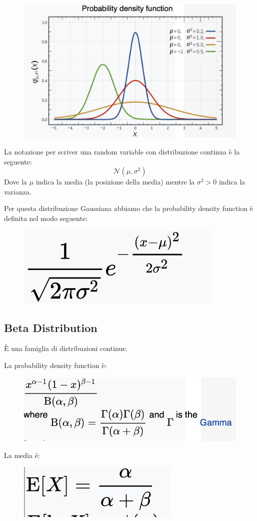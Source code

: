 \documentclass[14pt]{extreport}
\begin{document}
\begin{figure}[H]
\centering
\includegraphics[width=0.5\linewidth]{96.jpeg}
\end{figure}

La notazione per scriver una random variable con distribuzione continua è la seguente: $$\mathcal{N}(\mu, \sigma^2)$$ Dove la $\mu$ indica la media
(la posizione della media) mentre la $\sigma^2>0$ indica la varianza.

Per questa distribuzione Gaussiana abbiamo che la probability density function è definita nel modo seguente:

\begin{figure}[H]
\centering
\includegraphics[width=0.3\linewidth]{97.jpeg}
\end{figure} 

\subsection{Beta Distribution}

È una famiglia di distribuzioni continue.

La probability density function è:

\begin{figure}[H]
\centering
\includegraphics[width=0.5\linewidth]{124.jpeg}
\end{figure}

La media é:
\begin{figure}[H]
\centering
\includegraphics[width=0.4\linewidth]{125.jpeg}
\end{figure}
\end{document}
